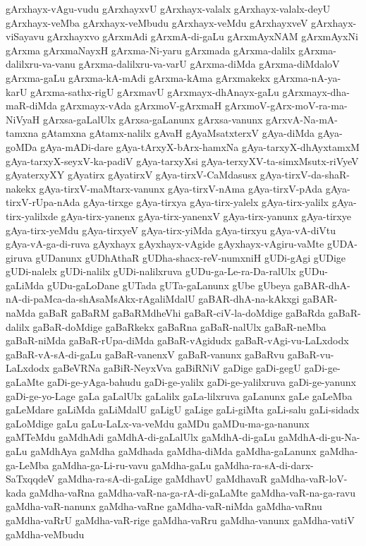 {gArxhayx-vAgu-vudu
gArxhayxvU
gArxhayx-valalx
gArxhayx-valalx-deyU
gArxhayx-veMba
gArxhayx-veMbudu
gArxhayx-veMdu
gArxhayxveV
gArxhayx-viSayavu
gArxhayxvo
gArxmAdi
gArxmA-di-gaLu
gArxmAyxNAM
gArxmAyxNi
gArxma
gArxmaNayxH
gArxma-Ni-yaru
gArxmada
gArxma-dalilx
gArxma-dalilxru-va-vanu
gArxma-dalilxru-va-varU
gArxma-diMda
gArxma-diMdaloV
gArxma-gaLu
gArxma-kA-mAdi
gArxma-kAma
gArxmakekx
gArxma-nA-ya-karU
gArxma-sathx-rigU
gArxmavU
gArxmayx-dhAnayx-gaLu
gArxmayx-dha-maR-diMda
gArxmayx-vAda
gArxmoV-gArxmaH
gArxmoV-gArx-moV-ra-ma-NiVyaH
gArxsa-gaLalUlx
gArxsa-gaLanunx
gArxsa-vanunx
gArxvA-Na-mA-tamxna
gAtamxna
gAtamx-nalilx
gAvaH
gAyaMsatxterxV
gAya-diMda
gAya-goMDa
gAya-mADi-dare
gAya-tArxyX-bArx-hamxNa
gAya-tarxyX-dhAyxtamxM
gAya-tarxyX-seyxV-ka-padiV
gAya-tarxyXsi
gAya-terxyXV-ta-simxMsutx-riVyeV
gAyaterxyXY
gAyatirx
gAyatirxV
gAya-tirxV-CaMdasusx
gAya-tirxV-da-shaR-nakekx
gAya-tirxV-maMtarx-vanunx
gAya-tirxV-nAma
gAya-tirxV-pAda
gAya-tirxV-rUpa-nAda
gAya-tirxge
gAya-tirxya
gAya-tirx-yalelx
gAya-tirx-yalilx
gAya-tirx-yalilxde
gAya-tirx-yanenx
gAya-tirx-yanenxV
gAya-tirx-yanunx
gAya-tirxye
gAya-tirx-yeMdu
gAya-tirxyeV
gAya-tirx-yiMda
gAya-tirxyu
gAya-vA-diVtu
gAya-vA-ga-di-ruva
gAyxhayx
gAyxhayx-vAgide
gAyxhayx-vAgiru-vaMte
gUDA-giruva
gUDanunx
gUDhAthaR
gUDha-shacx-reV-numxniH
gUDi-gAgi
gUDige
gUDi-nalelx
gUDi-nalilx
gUDi-nalilxruva
gUDu-ga-Le-ra-Da-ralUlx
gUDu-gaLiMda
gUDu-gaLoDane
gUTada
gUTa-gaLanunx
gUbe
gUbeya
gaBAR-dhA-nA-di-paMca-da-shAsaMsAkx-rAgaliMdalU
gaBAR-dhA-na-kAkxgi
gaBAR-naMda
gaBaR
gaBaRM
gaBaRMdheVhi
gaBaR-ciV-la-doMdige
gaBaRda
gaBaR-dalilx
gaBaR-doMdige
gaBaRkekx
gaBaRna
gaBaR-nalUlx
gaBaR-neMba
gaBaR-niMda
gaBaR-rUpa-diMda
gaBaR-vAgidudx
gaBaR-vAgi-vu-LaLxdodx
gaBaR-vA-sA-di-gaLu
gaBaR-vanenxV
gaBaR-vanunx
gaBaRvu
gaBaR-vu-LaLxdodx
gaBeVRNa
gaBiR-NeyxVva
gaBiRNiV
gaDige
gaDi-gegU
gaDi-ge-gaLaMte
gaDi-ge-yAga-bahudu
gaDi-ge-yalilx
gaDi-ge-yalilxruva
gaDi-ge-yanunx
gaDi-ge-yo-Lage
gaLa
gaLalUlx
gaLalilx
gaLa-lilxruva
gaLanunx
gaLe
gaLeMba
gaLeMdare
gaLiMda
gaLiMdalU
gaLigU
gaLige
gaLi-giMta
gaLi-salu
gaLi-sidadx
gaLoMdige
gaLu
gaLu-LaLx-va-veMdu
gaMDu
gaMDu-ma-ga-nanunx
gaMTeMdu
gaMdhAdi
gaMdhA-di-gaLalUlx
gaMdhA-di-gaLu
gaMdhA-di-gu-Na-gaLu
gaMdhAya
gaMdha
gaMdhada
gaMdha-diMda
gaMdha-gaLanunx
gaMdha-ga-LeMba
gaMdha-ga-Li-ru-vavu
gaMdha-gaLu
gaMdha-ra-sA-di-darx-SaTxqqdeV
gaMdha-ra-sA-di-gaLige
gaMdhavU
gaMdhavaR
gaMdha-vaR-loV-kada
gaMdha-vaRna
gaMdha-vaR-na-ga-rA-di-gaLaMte
gaMdha-vaR-na-ga-ravu
gaMdha-vaR-nanunx
gaMdha-vaRne
gaMdha-vaR-niMda
gaMdha-vaRnu
gaMdha-vaRrU
gaMdha-vaR-rige
gaMdha-vaRru
gaMdha-vanunx
gaMdha-vatiV
gaMdha-veMbudu
}
